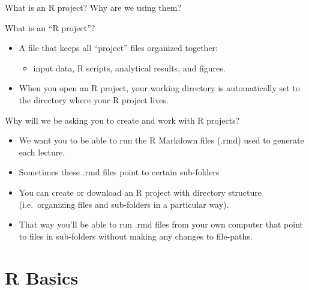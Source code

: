 \documentclass[
  8pt,
  ignorenonframetext,
  dvipsnames]{beamer}
\providecommand{\tightlist}{%
  \setlength{\itemsep}{0pt}\setlength{\parskip}{0pt}}
\let\olditem\item
\renewcommand{\item}{%
  \olditem\vspace{4pt}
}
\begin{document}
\begin{frame}{What is an R project? Why are we using them?}
\protect\hypertarget{what-is-an-r-project-why-are-we-using-them}{}

What is an ``R project''?

\begin{itemize}
\tightlist
\item
  A file that keeps all ``project'' files organized together:

  \begin{itemize}
  \tightlist
  \item
    input data, R scripts, analytical results, and figures.
  \end{itemize}
\item
  When you open an R project, your working directory is automatically
  set to the directory where your R project lives.
\end{itemize}

Why will we be asking you to create and work with R projects?

\begin{itemize}
\tightlist
\item
  We want you to be able to run the R Markdown files (.rmd) used to
  generate each lecture.
\item
  Sometimes these .rmd files point to certain sub-folders
\item
  You can create or download an R project with directory structure
  (i.e.~organizing files and sub-folders in a particular way).
\item
  That way you'll be able to run .rmd files from your own computer that
  point to files in sub-folders without making any changes to
  file-paths.
\end{itemize}

\end{frame}

\hypertarget{r-basics}{%
\section{R Basics}\label{r-basics}}
\end{document}
